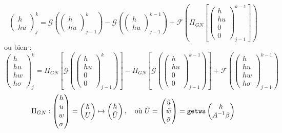 \documentclass[review,onefignum,onetabnum]{siamart220329}
\newcommand{\G}{\mathcal{G}}
\newcommand{\F}{\mathcal{F}}
\begin{document}
\begin{equation}
\begin{pmatrix}
h\\hu
\end{pmatrix}^{k}_{j} =
\G\left(
\begin{pmatrix}
h\\hu
\end{pmatrix}^{k}_{j-1}\right) - 
\G\left(
\begin{pmatrix}
h\\hu
\end{pmatrix}^{k-1}_{j-1}\right) +
\F\left(\Pi_{GN}\left[
\begin{pmatrix}
h\\hu \\ 0 \\ 0
\end{pmatrix}^{k-1}_{j-1}\right]\right)
\end{equation}
ou bien :
\begin{equation}
\begin{pmatrix}
h\\hu \\ hw \\ h\sigma
\end{pmatrix}^{k}_{j} =
\Pi_{GN}\left[\G\left(
\begin{pmatrix}
h\\hu \\ 0 \\ 0
\end{pmatrix}^{k}_{j-1}\right)\right] - 
\Pi_{GN}\left[\G\left(
\begin{pmatrix}
h\\hu \\ 0 \\ 0
\end{pmatrix}^{k-1}_{j-1}\right)\right] +
\F\left(
\begin{pmatrix}
h\\hu \\ hw \\ h\sigma
\end{pmatrix}^{k-1}_{j-1}\right)
\end{equation}
\begin{equation}
\Pi_{GN} : \begin{pmatrix}
h \\ u \\ w \\ \sigma
\end{pmatrix} = 
\begin{pmatrix}
h \\ U
\end{pmatrix}
\mapsto 
\begin{pmatrix}
h \\ \Tilde{U}
\end{pmatrix}, \quad \text{où } \Tilde{U} =
\begin{pmatrix}
\Tilde{u} \\ \Tilde{w} \\ \Tilde{\sigma}
\end{pmatrix}
= \texttt{getws}
\begin{pmatrix}
h \\ A^{-1} \beta
\end{pmatrix}
\end{equation}
\end{document}
